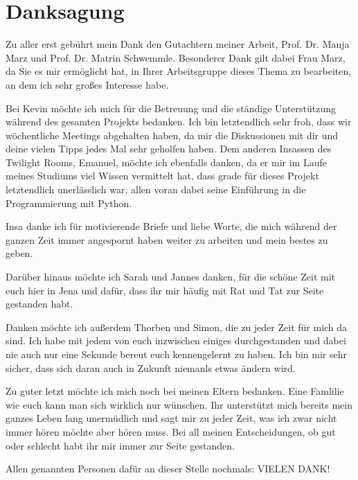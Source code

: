 \chapter*{Danksagung}

Zu aller erst gebührt mein Dank den Gutachtern meiner Arbeit, Prof. Dr. Manja Marz und Prof. Dr. Matrin Schwemmle. Besonderer Dank gilt dabei Frau Marz, da Sie es mir ermöglicht hat, in Ihrer Arbeitsgruppe dieses Thema zu bearbeiten, an dem ich sehr großes Interesse habe.

\vspace{1em}

Bei Kevin möchte ich mich für die Betreuung und die ständige Unterstützung während des gesamten Projekts bedanken. Ich bin letztendlich sehr froh, dass wir wöchentliche Meetings abgehalten haben, da mir die Diskussionen mit dir und deine vielen Tipps jedes Mal sehr geholfen haben. Dem anderen Insassen des Twilight Rooms, Emanuel, möchte ich ebenfalls danken, da er mir im Laufe meines Studiums viel Wissen vermittelt hat, dass grade für dieses Projekt letztendlich unerlässlich war, allen voran dabei seine Einführung in die Programmierung mit Python.

\vspace{1em}

Insa danke ich für motivierende Briefe und liebe Worte, die mich während der ganzen Zeit immer angespornt haben weiter zu arbeiten und mein bestes zu geben. 

\vspace{1em}

Darüber hinaus möchte ich Sarah und Jannes danken, für die schöne Zeit mit euch hier in Jena und dafür, dass ihr mir häufig mit Rat und Tat zur Seite gestanden habt. 

\vspace{1em}

Danken möchte ich außerdem Thorben und Simon, die zu jeder Zeit für mich da sind. Ich habe mit jedem von euch inzwischen einiges durchgestanden und dabei nie auch nur eine Sekunde bereut euch kennengelernt zu haben. Ich bin mir sehr sicher, dass sich daran auch in Zukunft niemanls etwas ändern wird.

\vspace{1em}

Zu guter letzt möchte ich mich noch bei meinen Eltern bedanken. Eine Famlilie wie euch kann man sich wirklich nur wünschen. Ihr unterstützt mich bereits mein ganzes Leben lang unermüdlich und sagt mir zu jeder Zeit, was ich zwar nicht immer hören möchte aber hören muss. Bei all meinen Entscheidungen, ob gut oder schlecht habt ihr mir immer zur Seite gestanden. 

\vspace{1em}

Allen genannten Personen dafür an dieser Stelle nochmals: VIELEN DANK!